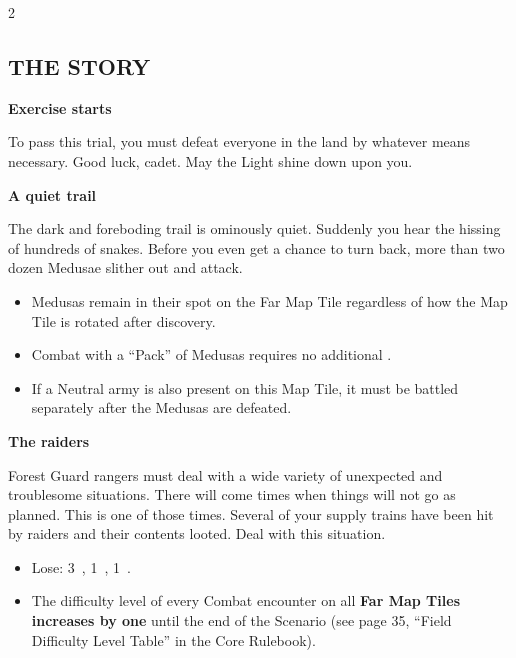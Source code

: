 \vspace*{-1.5em}

\pagebreak

\begin{multicols*}{2}

\subsection*{\MakeUppercase{The Story}}

\textbf{Exercise starts}

To pass this trial, you must defeat everyone in the land by whatever means necessary.
Good luck, cadet.
May the Light shine down upon you.

\textbf{A quiet trail}

The dark and foreboding trail is ominously quiet.
Suddenly you hear the hissing of hundreds of snakes.
Before you even get a chance to turn back, more than two dozen Medusae slither out and attack.

\textcolor{darkcandyapplered}{
\begin{itemize}
    \item Medusas remain in their spot on the Far Map Tile regardless of how the Map Tile is rotated after discovery.
    \item Combat with a ``Pack'' of Medusas requires no additional .
    \item If a Neutral army is also present on this Map Tile, it must be battled separately after the Medusas are defeated.
\end{itemize}
}

\textbf{The raiders}

Forest Guard rangers must deal with a wide variety of unexpected and troublesome situations.
There will come times when things will not go as planned.
This is one of those times.
Several of your supply trains have been hit by raiders and their contents looted.
Deal with this situation.
\begin{itemize}
  \item \textcolor{darkcandyapplered}{Lose: 3~, 1~, 1~.}
  \item \textcolor{darkcandyapplered}{The difficulty level of every Combat encounter on all \textbf{Far Map Tiles increases by one} until the end of the Scenario} (see page 35, ``Field Difficulty Level Table'' in the Core Rulebook).  %
\end{itemize}


\end{multicols*}
